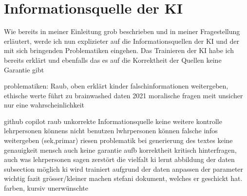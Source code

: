 \documentclass{article}
\begin{document}
\section{Informationsquelle der KI}
Wie bereits in meiner Einleitung grob beschrieben und in meiner Fragestellung erläutert, werde ich nun explizieter auf die Informationsquellen der KI und der mit sich bringenden Problematiken eingehen. Das Trainieren der KI habe ich bereits erklärt und ebenfalls das es auf die Korrektheit der Quellen keine Garantie gibt



problematiken: Raub, oben erklärt kinder falschinformationen weitergeben, ethische werte führt zu brainwashed
daten 2021
moralische fragen meit unsicher
nur eine wahrscheinlichkeit




github copilot
raub
unkorrekte Informationsquelle
keine weitere kontrolle
lehrpersonen könnens nicht benutzen
lwhrpersonen können falsche infos weitergeben (sek,primar)
riesen problematik
bei generierung des textes keine genauigkeit
mensch auch keine garantie aufb korrektheit
kritisch hinterfragen, auch was lehrpersonen sagen
zerstört die vielfalt
ki lernt abbildung der daten
subsection möglich
ki wird trainiert aufgrund der daten
anpassen der parameter wichtig
fazit
grösser/kleiner machen
stefani dokument, welches er geschickt hat.
farben, kursiv unerwünschte
\printbibliography
\end{document}
